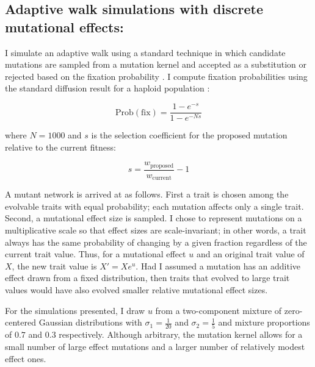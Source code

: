 \documentclass[dvips,12pt,twoside,titlepage]{article}
\begin{document}
\subsection*{Adaptive walk simulations with discrete mutational effects:}

I simulate an adaptive walk using a standard technique in which candidate mutations are sampled from a mutation kernel and accepted as a substitution or rejected based on the fixation probability \cite{Gillespie:1994vr}. I compute fixation probabilities using the standard diffusion result for a haploid population \cite{Ewens:2004fj}:

\begin{displaymath}
\mathrm{Prob}(\mathrm{fix}) = \frac{1 - e^{-s}}{1 - e^{-Ns}}
\end{displaymath}

\vspace{0.6cm}

\noindent where $N = 1000$ and $s$ is the selection coefficient for the proposed mutation relative to the current fitness:

\begin{displaymath}
s = \frac{w_{\mathrm{proposed}}}{w_{\mathrm{current}}} - 1
\end{displaymath}

\vspace{0.6cm}

A mutant network is arrived at as follows. 
First a trait is chosen among the evolvable traits with equal probability; each mutation affects only a single trait. 
Second, a mutational effect size is sampled. 
I chose to represent mutations on a multiplicative scale so that effect sizes are scale-invariant; in other words, a trait always has the same probability of changing by a given fraction regardless of the current trait value.
Thus, for a mutational effect $u$ and an original trait value of $X$, the new trait value is $X' = X e^{u}$. 
Had I assumed a mutation has an additive effect drawn from a fixed distribution, then traits that evolved to large trait values would have also evolved smaller relative mutational effect sizes. 

For the simulations presented, I draw $u$ from a two-component mixture of zero-centered Gaussian distributions with $\sigma_{1} = \frac{1}{20}$ and $\sigma_{2} = \frac{1}{5}$ and mixture proportions of $0.7$ and $0.3$ respectively. 
Although arbitrary, the mutation kernel allows for a small number of large effect mutations and a larger number of relatively modest effect ones.
\end{document}
